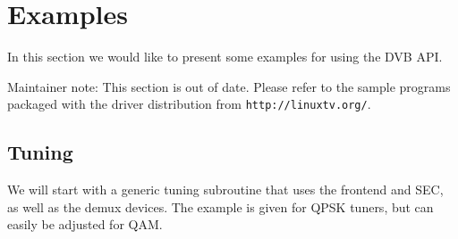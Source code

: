 \chapter{Examples}
In this section we would like to present some examples for using the DVB API.

Maintainer note: This section is out of date. Please refer to the sample
programs packaged with the driver distribution from
\texttt{http://linuxtv.org/}.

\section{Tuning}
We will start with a generic tuning subroutine that uses the frontend
and SEC, as well as the demux devices. The example is given for QPSK
tuners, but can easily be adjusted for QAM.

